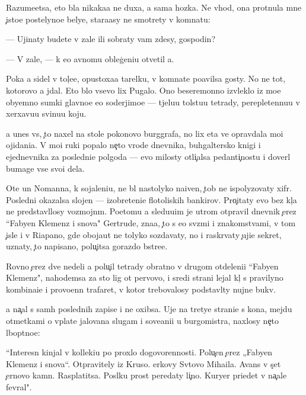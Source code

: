 \documentclass[10pt]{book}
\begin{document}
Razume{\y}etsa, eto b{\yi}la nikaka{\y}a ne duxa, a sama hoz{\ia}{\y}ka. Ne vhod{\ia}, ona prot{\ia}nula mne {\c}isto{\y}e postelyno{\y}e belye, stara{\y}asy ne smotrety v komnatu:

— Ujinaty budete v zale ili sobraty vam zdesy, gospodin?

— V zale, — k {\y}e{\y}o {\y}avnomu obleg{\c}eni{\y}u otvetil {\y}a.

Poka {\y}a sidel v tol{\c}e{\y}e, opustoxa{\y}a tarelku, v komnate po{\y}avilsa gosty. No ne tot, kotorovo {\y}a jdal. Eto b{\yi}lo vsevo lix Pugalo. Ono bes{\q}eremonno izvleklo iz mo{\y}e{\y} obyemno{\y} sumki glavno{\y}e {\y}e{\y}o soderjimo{\y}e — t{\ia}jelu{\y}u tolstu{\y}u tetrady, perepletennu{\y}u v xerxavu{\y}u svinu{\y}u koju.

{\Y}a unes vs{\e}, {\c}to naxel na stole poko{\y}novo burggrafa, no lix eta ve{\x} opravdala mo{\y}i ojidani{\y}a. V mo{\y}i ruki popalo ne{\c}to vrode dnevnika, buhgaltersko{\y} knigi i {\y}ejednevnika za posledni{\y}e polgoda — {\y}evo milosty otli{\c}alsa pedanti{\c}nost{\y}u i dover{\ia}l bumage vse svo{\y}i dela.

Ote{\q} un Nomanna, k sojaleni{\y}u, ne b{\yi}l nastolyko na{\y}iven, {\c}tob{\yi} ne ispolyzovaty xifr. Posledni{\y} okazalsa slojen — izobreteni{\y}e flotoli{\y}skih bankirov. Pro{\c}itaty {\y}evo bez kl{\iu}{\c}a ne predstavl{\ia}losy vozmojn{\yi}m. Poetomu {\y}a sledu{\y}u{\x}im je utrom otpravil dnevnik {\c}erez ``Fabyen Klemenz i s{\yi}nov{\y}a" Gertrude, zna{\y}a, {\c}to s {\y}e{\y}o sv{\ia}z{\ia}mi i znakomstvami, v tom {\c}isle i v Riapano, gde oboja{\y}ut ne tolyko sozdavaty, no i raskr{\yi}vaty {\c}uji{\y}e sekret{\yi}, uznaty, {\c}to napisano, polu{\c}itsa gorazdo b{\yi}stre{\y}e.

Rovno {\c}erez dve nedeli {\y}a polu{\c}il tetrady obratno v drugom otdeleni{\y}i ``Fabyen Klemenz", nahod{\ia}{\x}emsa za sto lig ot pervovo, i sredi strani{\q} lejal kl{\iu}{\c} s pravilyno{\y} kombina{\q}i{\y}e{\y} i provo{\x}enn{\yi}{\y} trafaret, v kotor{\yi}{\y} trebovalosy podstavl{\ia}ty nujn{\yi}{\y}e bukv{\yi}.

{\Y}a na{\c}al s sam{\yi}h poslednih zapise{\y} i ne oxibsa. Uje na tretye{\y} strani{\q}e s kon{\q}a, mejdu otmetkami o v{\yi}plate jalovan{\y}a slugam i sove{\x}ani{\y}i u burgomistra, naxlosy ne{\c}to l{\iu}bop{\yi}tno{\y}e:

``Interesn{\yi}{\y} kinjal v kollek{\q}i{\y}u po proxlo{\y} dogovorennosti. Polu{\c}en {\c}erez „Fabyen Klemenz i s{\yi}nov{\y}a“. Otpravitely iz Kruso. {\Q}erkovy Sv{\ia}tovo Miha{\y}ila. Avans v s{\c}et {\c}ernovo kamn{\ia}. Rasplatitsa. Pos{\yi}lku pros{\ia}t peredaty li{\c}no. Kuryer pri{\y}edet v na{\c}ale fevral{\ia}".
\end{document}
